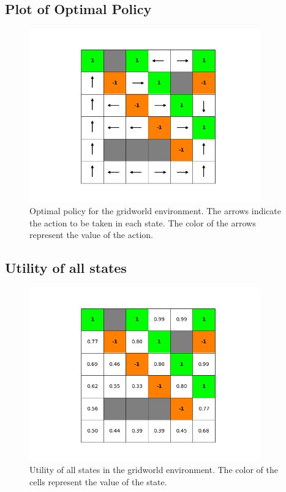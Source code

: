 \documentclass{article}
\begin{document}
\subsection{Plot of Optimal Policy}

\begin{figure}[H]
    \includegraphics[width=100mm]{../asset/value_iteration_policy.png}
    \caption{Optimal policy for the gridworld environment. The arrows indicate the action to be taken in each state. The color of the arrows represent the value of the action.}
    \label{fig:value_iteration_policy}
\end{figure}

\subsection{Utility of all states}

\begin{figure}[H]
    \includegraphics[width=100mm]{../asset/value_iteration_utility.png}
    \caption{Utility of all states in the gridworld environment. The color of the cells represent the value of the state.}
    \label{fig:value_iteration_utility}
\end{figure}
\end{document}
